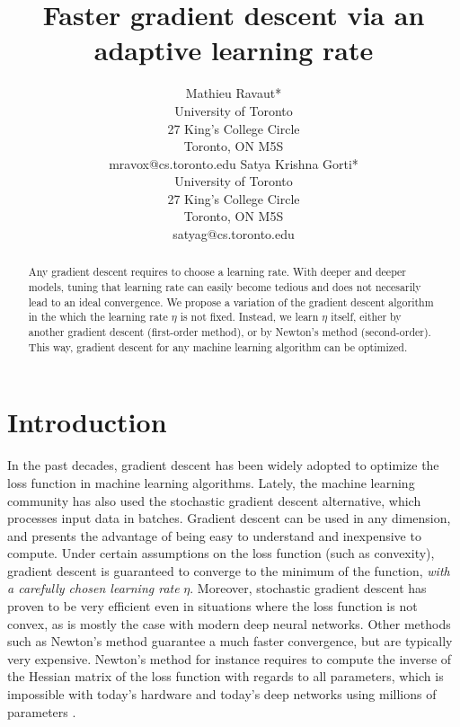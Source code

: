 \documentclass{article}
\title{Faster gradient descent via an adaptive learning rate}
\author{
	Mathieu Ravaut* \\ 
	University of Toronto \\
	27 King's College Circle\\
	Toronto, ON M5S\\
	mravox@cs.toronto.edu 
	\And
  	Satya Krishna Gorti*\\
	University of Toronto\\
	27 King's College Circle\\
	Toronto, ON M5S\\
	satyag@cs.toronto.edu	
}
\begin{document}
  
  
  \maketitle
  
  \begin{abstract}
    Any gradient descent requires to choose a learning rate. With deeper and deeper models, tuning that learning rate can easily become tedious and does not necesarily lead to an ideal convergence. We propose a variation of the gradient descent algorithm in the which the learning rate $\eta$ is not fixed. Instead, we learn $\eta$ itself, either by another gradient descent (first-order method), or by Newton's method (second-order). This way, gradient descent for any machine learning algorithm can be optimized. 
  \end{abstract}
  
  \thispagestyle{equalc}
  \section{Introduction}
  
  In the past decades, gradient descent has been widely adopted to optimize the loss function in machine learning algorithms. Lately, the machine learning community has also used the stochastic gradient descent alternative, which processes input data in batches. Gradient descent can be used in any dimension, and presents the advantage of being easy to understand and inexpensive to compute. Under certain assumptions on the loss function (such as convexity), gradient descent is guaranteed to converge to the minimum of the function, \emph{with a carefully chosen learning rate} $\eta$. Moreover, stochastic gradient descent has proven to be very efficient even in situations where the loss function is not convex, as is mostly the case with modern deep neural networks. Other methods such as Newton's method guarantee a much faster convergence, but are typically very expensive. Newton's method for instance requires to compute the inverse of the Hessian matrix of the loss function with regards to all parameters, which is impossible with today's hardware and today's deep networks using millions of parameters \cite{krizhevsky2012imagenet}. \\
  
\end{document}
